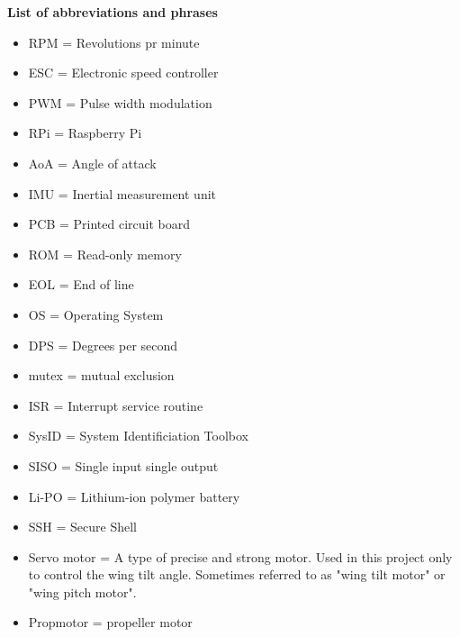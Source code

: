 \textbf{List of abbreviations and phrases}
\begin{itemize}
    \item RPM = Revolutions pr minute
    \item ESC = Electronic speed controller
    \item PWM = Pulse width modulation
    \item RPi = Raspberry Pi 
    \item AoA = Angle of attack
    \item IMU = Inertial measurement unit
    \item PCB = Printed circuit board
    \item ROM = Read-only memory
    \item EOL = End of line
    \item OS = Operating System
    \item DPS = Degrees per second
    \item mutex = mutual exclusion
    \item ISR = Interrupt service routine
    \item SysID = System Identificiation Toolbox
    \item SISO = Single input single output
    \item Li-PO = Lithium-ion polymer battery
    \item SSH = Secure Shell
    \item Servo motor = A type of precise and strong motor. Used in this project only to control the wing tilt angle. Sometimes referred to as "wing tilt motor" or "wing pitch motor".
    \item Propmotor = propeller motor
\end{itemize}
